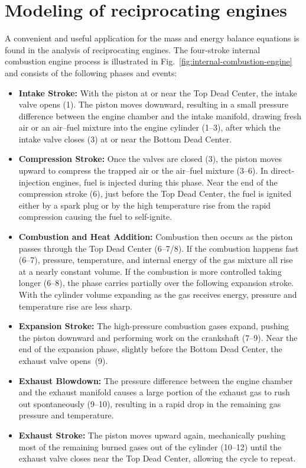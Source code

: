 \section{Modeling of reciprocating engines}
A convenient and useful application for the mass and energy balance equations is found in the analysis of reciprocating engines. The four-stroke internal combustion engine process is illustrated in Fig.~\ref{fig:internal-combustion-engine} and consists of the following phases and events:
\begin{itemize}
    \item[1--3] \textbf{Intake Stroke:} With the piston at or near the Top Dead Center, the intake valve opens (1). The piston moves downward, resulting in a small pressure difference between the engine chamber and the intake manifold, drawing fresh air or an air--fuel mixture into the engine cylinder (1--3), after which the intake valve closes (3) at or near the Bottom Dead Center.
    \item[3--6] \textbf{Compression Stroke:} Once the valves are closed (3), the piston moves upward to compress the trapped air or the air--fuel mixture (3--6). In direct-injection engines, fuel is injected during this phase. Near the end of the compression stroke (6), just before the Top Dead Center, the fuel is ignited either by a spark plug or by the high temperature rise from the rapid compression causing the fuel to self-ignite.
    \item[6--7/8] \textbf{Combustion and Heat Addition:} Combustion then occurs as the piston passes through the Top Dead Center (6--7/8). If the combustion happens fast (6--7), pressure, temperature, and internal energy of the gas mixture all rise at a nearly constant volume. If the combustion is more controlled taking longer (6--8), the phase carries partially over the following expansion stroke. With the cylinder volume expanding as the gas receives energy, pressure and temperature rise are less sharp.
    \item[7--9] \textbf{Expansion Stroke:} The high-pressure combustion gases expand, pushing the piston downward and performing work on the crankshaft (7--9). Near the end of the expansion phase, slightly before the Bottom Dead Center, the exhaust valve opens~(9).
    \item[9--10] \textbf{Exhaust Blowdown:} The pressure difference between the engine chamber and the exhaust manifold causes a large portion of the exhaust gas to rush out spontaneously (9--10), resulting in a rapid drop in the remaining gas pressure and temperature.
    \item[10--12] \textbf{Exhaust Stroke:} The piston moves upward again, mechanically pushing most of the remaining burned gases out of the cylinder (10--12) until the exhaust valve closes near the Top Dead Center, allowing the cycle to repeat.
\end{itemize}
